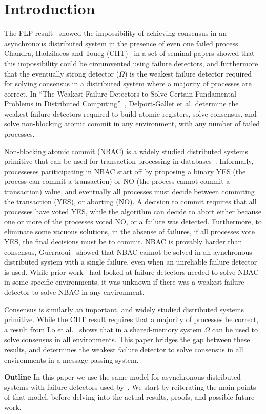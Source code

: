 \section{Introduction}
The FLP result~\cite{fischer1985impossibility} showed the impossibility of achieving consensus in an asynchronous
distributed system in the presence of even one failed process. Chandra, Hadzilacos and
Toueg (CHT)~\cite{chandra1996unreliable, chandra1996weakest} in a set of seminal papers showed that this impossibility could
be circumvented using failure detectors, and furthermore that the eventually strong detector ($\Omega$) is the
weakest failure detector required for solving consensus in a distributed system where a majority of processes are
correct. In ``The Weakest Failure Detectors to Solve Certain Fundamental Problems in Distributed
Computing''~\cite{delporte2004weakest}, Delport-Gallet et al. determine the weakest failure detectors required to build
atomic registers, solve consensus, and solve non-blocking atomic commit in any environment, \ie with any number of
failed processes.

Non-blocking atomic commit (NBAC) is a widely studied distributed systems primitive that can be used for transaction
processing in databases~\cite{gray1978notes}. Informally, processeses pariticipating in NBAC start off by proposing a
binary YES (the process can commit a transaction) or NO (the process cannot commit a transaction) value, and eventually
all processes must decide between commiting the transaction (\ie YES), or aborting (\ie NO). A decision to commit
requires that all processes have voted YES, while the algorithm can decide to abort either because one or more of the
processes voted NO, or a failure was detected. Furthermore, to eliminate some vacuous solutions, in the absense of
failures, if all processes vote YES, the final decisions must be to commit. NBAC is provably harder than consensus,
Guerraoui~\cite{guerraoui1995revisiting} showed that  NBAC
cannot be solved in an aynchronous distributed system with a single failure, even when an unreliable failure detector is
used. While prior work~\cite{guerraoui2002weakest} had looked at failure detectors needed to solve NBAC in some specific
environments, it was unknown if there was a weakest failure detector to solve NBAC in any environment.

Consensus is similarly an important, and widely studied distributed systems primitive. While the CHT result requires
that a majority of processes be correct, a result from Lo et al.~\cite{lo1994using} shows that in a shared-memory system
$\Omega$ can be used to solve consensus in all environments. This paper bridges the gap between these results,
and determines the weakest failure detector to solve consensus in all environments in a message-passing system.

\textbf{Outline} In this paper we use the same model for asynchronous distributed systems with failure detectors used
by~\cite{chandra1996unreliable, chandra1996weakest}. We start by reiterating the main points of that model, before
delving into the actual results, proofs, and possible future work.

